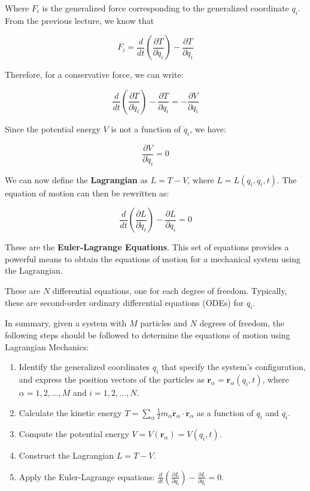 Where $F_i$ is the generalized force corresponding to the generalized coordinate $q_i$.
From the previous lecture, we know that

\[
   F_i = \frac{d}{dt} \left(\frac {\partial T}{\partial \dot{q_i}}\right) - \frac{\partial T}{\partial q_i}
\]

Therefore, for a conservative force, we can write:

\[
    \frac{d}{dt} \left(\frac{\partial T}{\partial \dot{q}_i}\right) - \frac{\partial T}{\partial q_i} = -\frac{\partial V}{\partial q_i}
\]

Since the potential energy $V$ is not a function of $\dot{q}_i$, we have:

\[
    \frac{\partial V}{\partial \dot{q}_i}=0
\]

We can now define the \textbf{Lagrangian} as $L = T - V$, where 
$L = L(q_i, \dot{q}_i, t)$. The equation of motion can then be rewritten as:

\[
    \frac{d}{dt} \left(\frac{\partial L}{\partial \dot{q}_i}\right) - \frac{\partial L}{\partial q_i} = 0
\]

These are the \textbf{Euler-Lagrange Equations}. This set of equations provides a 
powerful means to obtain the equations of motion for a mechanical system using the 
Lagrangian.

These are $N$ differential equations, one for each degree of freedom. Typically, these 
are second-order ordinary differential equations (ODEs) for $q_i$.

In summary, given a system with $M$ particles and $N$ degrees of freedom, the following 
steps should be followed to determine the equations of motion using Lagrangian Mechanics:

\begin{enumerate}
    \item Identify the generalized coordinates $q_i$ that specify the system's 
    configuration, and express the position vectors of the particles as 
    $\mathbf{r}_\alpha=\mathbf{r}_\alpha(q_i, t)$, where $\alpha = 1, 2, \dots, M$ and 
    $i = 1, 2, \dots, N$.
    \item Calculate the kinetic energy 
    $T = \sum_\alpha \frac{1}{2} m_\alpha \dot{\mathbf{r}}_\alpha \cdot \dot{\mathbf{r}}_\alpha$ 
    as a function of $q_i$ and $\dot{q}_i$.
    \item Compute the potential energy $V = V(\mathbf{r}_\alpha) = V(q_i, t)$.
    \item Construct the Lagrangian $L = T - V$.
    \item Apply the Euler-Lagrange equations: 
    $\frac{d}{dt} \left(\frac{\partial L}{\partial \dot{q}_i}\right) - \frac{\partial L}{\partial q_i} = 0$.
\end{enumerate}

